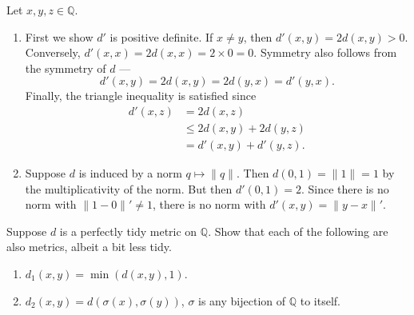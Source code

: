 \documentclass[12 pt, letterpaper]{hmcpset}
\begin{document}
\begin{solution}
	Let $x, y, z \in \mathbb{Q}$.
	\begin{enumerate}
		\item First we show $d'$ is positive definite. If $x \neq y$, then $d'(x, y) = 2 d(x, y) > 0$. Conversely, $d'(x, x) = 2 d(x, x) = 2 \times 0 = 0$. Symmetry also follows from the symmetry of $d$ ---
			\[
				d'(x, y) = 2 d(x, y) = 2 d(y, x) = d'(y, x).
			\]
			Finally, the triangle inequality is satisfied since
			\begin{align*}
				d'(x, z) & = 2 d(x, z) \\
					 & \le 2 d(x, y) + 2 d(y, z) \\
					 & = d'(x, y) + d'(y, z).
			\end{align*}

		\item Suppose $d$ is induced by a norm $q \mapsto \lVert q \rVert$. Then $d(0, 1) = \lVert 1 \rVert = 1$ by the multiplicativity of the norm. But then  $d'(0, 1) = 2$. Since there is no norm with $\lVert 1 - 0 \rVert' \neq 1$, there is no norm with $d'(x, y) = \lVert y - x \rVert'$.
	\end{enumerate}
\end{solution}

\pagebreak

\begin{problem}[(8)]
	Suppose $d$ is a perfectly tidy metric on $\mathbb{Q}$. Show that each of the following are also metrics, albeit a bit less tidy.
	\begin{enumerate}
		\item $d_{1}(x, y) = \min(d(x, y), 1)$.

		\item $d_{2}(x, y) = d(\sigma(x), \sigma(y))$, $\sigma$ is any bijection of $\mathbb{Q}$ to itself.
	\end{enumerate}
\end{problem}
\end{document}
